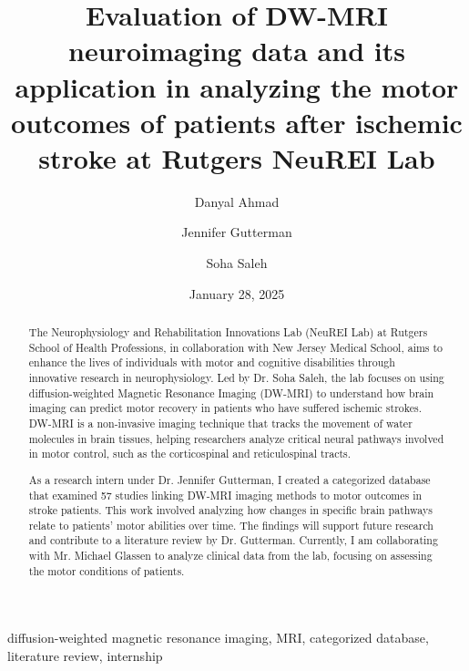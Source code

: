 ﻿\documentclass[12pt,conference,onecolumn]{IEEEtran}
\title{Evaluation of DW-MRI neuroimaging data and its application in analyzing the motor outcomes of patients after ischemic stroke at Rutgers NeuREI Lab}
\author{Danyal Ahmad \and Jennifer Gutterman \and Soha Saleh}
\date{January 28, 2025}
\newcommand{\keywords}{diffusion-weighted magnetic resonance imaging, MRI, categorized database, literature review, internship}
\begin{document}
\maketitle 

\begin{abstract}
The Neurophysiology and Rehabilitation Innovations Lab (NeuREI Lab) at Rutgers School of Health Professions, in collaboration with New Jersey Medical School, aims to enhance the lives of individuals with motor and cognitive disabilities through innovative research in neurophysiology. Led by Dr. Soha Saleh, the lab focuses on using diffusion-weighted Magnetic Resonance Imaging (DW-MRI) to understand how brain imaging can predict motor recovery in patients who have suffered ischemic strokes. DW-MRI is a non-invasive imaging technique that tracks the movement of water molecules in brain tissues, helping researchers analyze critical neural pathways involved in motor control, such as the corticospinal and reticulospinal tracts.

As a research intern under Dr. Jennifer Gutterman, I created a categorized database that examined 57 studies linking DW-MRI imaging methods to motor outcomes in stroke patients. This work involved analyzing how changes in specific brain pathways relate to patients' motor abilities over time. The findings will support future research and contribute to a literature review by Dr. Gutterman. Currently, I am collaborating with Mr. Michael Glassen to analyze clinical data from the lab, focusing on assessing the motor conditions of patients.\end{abstract}

\begin{IEEEkeywords}
\keywords
\end{IEEEkeywords}
\end{document}
